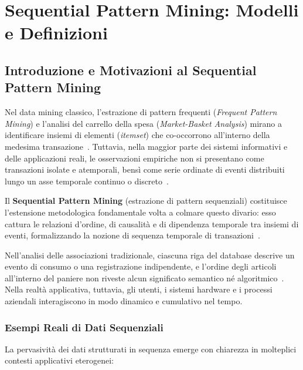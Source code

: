 \chapter{Sequential Pattern Mining: Modelli e Definizioni}
\label{chap:dm-sequential-pattern-mining}

\FloatBarrier
\section{Introduzione e Motivazioni al Sequential Pattern Mining}
\label{sec:dm-seq-intro}

Nel data mining classico, l'estrazione di pattern frequenti (\textit{Frequent Pattern Mining}) e l'analisi del carrello della spesa (\textit{Market-Basket Analysis}) mirano a identificare insiemi di elementi (\textit{itemset}) che co-occorrono all'interno della medesima transazione~\cite{tan2018, agrawal1994}. Tuttavia, nella maggior parte dei sistemi informativi e delle applicazioni reali, le osservazioni empiriche non si presentano come transazioni isolate e atemporali, bensì come serie ordinate di eventi distribuiti lungo un asse temporale continuo o discreto~\cite{agrawal1995, srikant1996}.

Il \textbf{Sequential Pattern Mining} (estrazione di pattern sequenziali) costituisce l'estensione metodologica fondamentale volta a colmare questo divario: esso cattura le relazioni d'ordine, di causalità e di dipendenza temporale tra insiemi di eventi, formalizzando la nozione di sequenza temporale di transazioni~\cite{tan2018, agrawal1995}.

Nell'analisi delle associazioni tradizionale, ciascuna riga del database descrive un evento di consumo o una registrazione indipendente, e l'ordine degli articoli all'interno del paniere non riveste alcun significato semantico né algoritmico~\cite{tan2018}. Nella realtà applicativa, tuttavia, gli utenti, i sistemi hardware e i processi aziendali interagiscono in modo dinamico e cumulativo nel tempo.

\FloatBarrier
\subsection{Esempi Reali di Dati Sequenziali}
La pervasività dei dati strutturati in sequenza emerge con chiarezza in molteplici contesti applicativi eterogenei:

